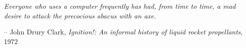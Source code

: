 \documentclass[\main/thesis.tex]{subfiles}
\begin{document}
\begin{quotepage}
 \vspace*{1in}
 \begin{center}
	\emph{Everyone who uses a computer frequently has had, from time to time, a mad desire to attack the precocious abacus with an axe.}
	\begin{flushright}
		-- John Drury Clark, \emph{Ignition!: An informal history of liquid rocket propellants}, 1972
	\end{flushright}
 \end{center}
\end{quotepage}
\end{document}
